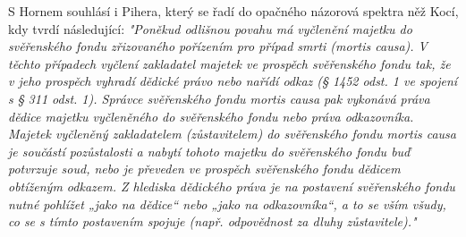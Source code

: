 \documentclass{article}
\begin{document}
 S Hornem souhlásí i Pihera, který se řadí do opačného názorová spektra něž Kocí, kdy tvrdí následující: \textit{"Poněkud odlišnou povahu má vyčlenění majetku do svěřenského fondu zřizovaného pořízením pro případ smrti (mortis causa). V těchto případech vyčlení zakladatel majetek ve prospěch svěřenského fondu tak, že v jeho prospěch vyhradí dědické právo nebo nařídí odkaz (§ 1452 odst. 1 ve spojení s § 311 odst. 1). Správce svěřenského fondu mortis causa pak vykonává práva dědice majetku vyčleněného do svěřenského fondu nebo práva odkazovníka. Majetek vyčleněný zakladatelem (zůstavitelem) do svěřenského fondu mortis causa je součástí pozůstalosti a nabytí tohoto majetku do svěřenského fondu buď potvrzuje soud, nebo je převeden ve prospěch svěřenského fondu dědicem obtíženým odkazem. Z hlediska dědického práva je na postavení svěřenského fondu nutné pohlížet „jako na dědice“ nebo „jako na odkazovníka“, a to se vším všudy, co se s tímto postavením spojuje (např. odpovědnost za dluhy zůstavitele)."}\\
 
 \newpage
 
\end{document}
